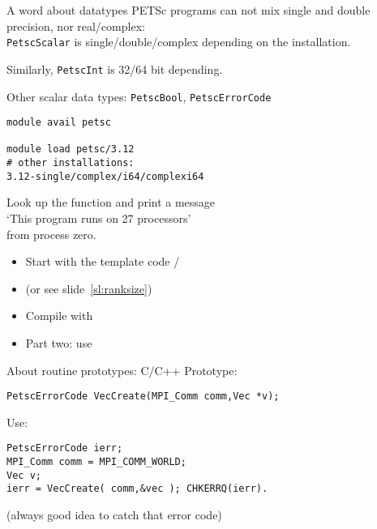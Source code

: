 \begin{frame}[containsverbatim]{A word about datatypes}
PETSc programs can not mix single and double precision, nor real/complex:\\
\lstinline{PetscScalar} is single/double/complex depending on the installation.

Similarly, \lstinline{PetscInt} is 32/64 bit depending.

Other scalar data types: \lstinline{PetscBool}, \lstinline{PetscErrorCode}

\begin{taccnote}
\begin{verbatim}
module avail petsc

module load petsc/3.12
# other installations:
3.12-single/complex/i64/complexi64
\end{verbatim}
\end{taccnote}

\end{frame}

\begin{exerciseframe}[hello]
Look up the function  and print a message\\
`This program runs on 27 processors'\\
from process zero.

\begin{itemize}
\item Start with the template code /
\item (or see slide~\ref{sl:ranksize})
\item Compile with 
\item Part two: use 
\end{itemize}
\end{exerciseframe}


\begin{frame}[containsverbatim]{About routine prototypes: C/C++}
  \label{sec:protos}
Prototype:
\begin{lstlisting}
PetscErrorCode VecCreate(MPI_Comm comm,Vec *v);
\end{lstlisting}
Use:
\begin{lstlisting}
PetscErrorCode ierr;
MPI_Comm comm = MPI_COMM_WORLD;
Vec v;
ierr = VecCreate( comm,&vec ); CHKERRQ(ierr).
\end{lstlisting}
(always good idea to catch that error code)
\end{frame}

